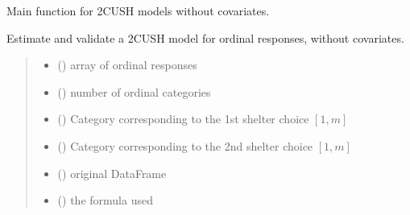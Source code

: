 \documentclass[letterpaper,10pt,english]{sphinxmanual}
\begin{document}
\begin{fulllineitems}
\label{\detokenize{cubmods:cubmods.cush2.mle}}
\pysigstartsignatures
{}
\pysigstopsignatures
\sphinxAtStartPar
Main function for 2\sphinxhyphen{}CUSH models without covariates.

\sphinxAtStartPar
Estimate and validate a 2\sphinxhyphen{}CUSH model for ordinal responses, without covariates.
\begin{quote}\begin{description}
\begin{itemize}
\item {} 
\sphinxAtStartPar
{} () \textendash{} array of ordinal responses

\item {} 
\sphinxAtStartPar
{} () \textendash{} number of ordinal categories

\item {} 
\sphinxAtStartPar
{} () \textendash{} Category corresponding to the 1st shelter choice \([1,m]\)

\item {} 
\sphinxAtStartPar
{} () \textendash{} Category corresponding to the 2nd shelter choice \([1,m]\)

\item {} 
\sphinxAtStartPar
{} () \textendash{} original DataFrame

\item {} 
\sphinxAtStartPar
{} () \textendash{} the formula used


\end{itemize}
\end{description}
\end{quote}
\end{fulllineitems}
\end{document}
